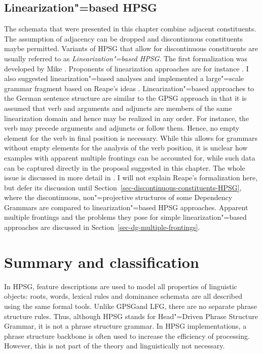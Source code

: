 \subsection{Linearization"=based HPSG}
\label{sec-linearization-HPSG}

The schemata that were presented in this chapter combine adjacent constituents. The assumption of
adjacency can be dropped and discontinuous constituents maybe permitted. Variants of HPSG that allow
for discontinuous constituents are usually referred to as \emph{Linearization"=based HPSG}. The
first formalization was developed by Mike \citet{Reape91,Reape92a,Reape94a}. Proponents of linearization
approaches are for instance
\citet{Kathol95a,Kathol2000a,DS99a,RS99a,Crysmann2003c,BS2004a,Sato:06cluk,Wetta2011a}. I also
suggested linearization"=based analyses \citep{Mueller99a,Mueller2002b} and implemented a
large"=scale grammar fragment based on Reape's ideas \citep{Babel}. Linearization"=based approaches
to the German sentence structure are similar to the GPSG approach in that it is assumed that verb
and arguments and adjuncts are members of the same linearization domain and hence may be realized in
any order. For instance, the verb may precede arguments and adjuncts or follow them. Hence, no empty element for the verb in
final position is necessary. While this allows for grammars without empty elements for the analysis of the verb
position, it is unclear how examples with apparent multiple frontings can be accounted for, while
such data can be captured directly in the proposal suggested in this chapter. The
whole issue is discussed in more detail in . I will not explain Reape's
formalization here, but defer its discussion until Section~\ref{sec-discontinuous-constituents-HPSG}, where the discontinuous, non"=projective
structures of some Dependency Grammars are compared to linearization"=based HPSG
approaches. Apparent multiple frontings and the problems they pose for simple linearization"=based
approaches are discussed in Section~\ref{sec-dg-multiple-frontings}.


\section{Summary and classification}

In HPSG, feature descriptions are used to model all properties of linguistic objects: roots, words, lexical rules and dominance schemata are
all described using the same formal tools. Unlike GPSG\indexgpsg and LFG\indexlfg, there are no separate phrase structure rules. Thus, although
HPSG stands for Head"=Driven Phrase Structure Grammar, it is not a phrase structure grammar. In HPSG implementations, a phrase structure backbone
is often used to increase the efficiency of processing. However, this is not part of the theory and
linguistically not necessary.


